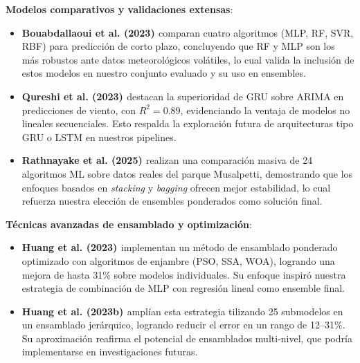 \documentclass[conference]{IEEEtran}
\begin{document}
\textbf{Modelos comparativos y validaciones extensas}:
\begin{itemize}[leftmargin=*,itemsep=1pt]

\item \textbf{Bouabdallaoui et al. (2023) \cite{bouabdallaoui2023application}} comparan cuatro algoritmos (MLP, RF, SVR, RBF) para predicción de corto plazo, concluyendo que RF y MLP son los más robustos ante datos meteorológicos volátiles, lo cual valida la inclusión de estos modelos en nuestro conjunto evaluado y su uso en ensembles.

\item \textbf{Qureshi et al. (2023) \cite{qureshi2023shortterm}} destacan la superioridad de GRU sobre ARIMA en predicciones de viento, con \(R^2 = 0.89\), evidenciando la ventaja de modelos no lineales secuenciales. Esto respalda la exploración futura de arquitecturas tipo GRU o LSTM en nuestros pipelines.

\item \textbf{Rathnayake et al. (2025) \cite{rathnayake2025predicting}} realizan una comparación masiva de 24 algoritmos ML sobre datos reales del parque Musalpetti, demostrando que los enfoques basados en \textit{stacking} y \textit{bagging} ofrecen mejor estabilidad, lo cual refuerza nuestra elección de ensembles ponderados como solución final.

\end{itemize}
	
\textbf{Técnicas avanzadas de ensamblado y optimización}:
\begin{itemize}[leftmargin=*,itemsep=1pt]

\item \textbf{Huang et al. (2023) \cite{huang2023ensemble}} implementan un método de ensamblado ponderado optimizado con algoritmos de enjambre (PSO, SSA, WOA), logrando una mejora de hasta 31\% sobre modelos individuales. Su enfoque inspiró nuestra estrategia de combinación de MLP con regresión lineal como ensemble final.

\item \textbf{Huang et al. (2023b) \cite{huang2023multiobjective}} amplían esta estrategia tilizando 25 submodelos en un ensamblado jerárquico, logrando reducir el error en un rango de 12–31\%. Su aproximación reafirma el potencial de ensamblados multi-nivel, que podría implementarse en investigaciones futuras.

\end{itemize}
\end{document}
